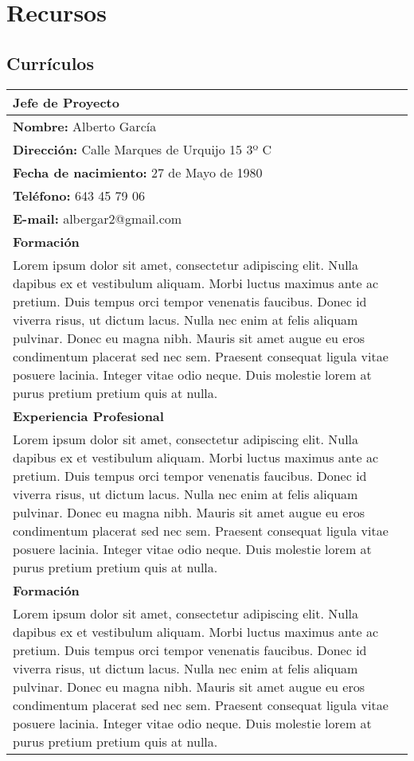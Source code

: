 \section{Recursos}
\subsection{Currículos}

\begin{table}[H]
\begin{center}
\begin{tabular}{p{}}
\textbf{Jefe de Proyecto}  \\
\hline
\textbf{Nombre:} Alberto García\\
\textbf{Dirección:} Calle Marques de Urquijo 15 3º C\\
\textbf{Fecha de nacimiento:} 27 de Mayo de 1980 \\
\textbf{Teléfono:} 643 45 79 06\\
\textbf{E-mail:} albergar2@gmail.com\\
\hline \hline
\textbf{Formación}  \\
\hline
Lorem ipsum dolor sit amet, consectetur adipiscing elit. Nulla dapibus ex et vestibulum aliquam. Morbi luctus maximus ante ac pretium. Duis tempus orci tempor venenatis faucibus. Donec id viverra risus, ut dictum lacus. Nulla nec enim at felis aliquam pulvinar. Donec eu magna nibh. Mauris sit amet augue eu eros condimentum placerat sed nec sem. Praesent consequat ligula vitae posuere lacinia. Integer vitae odio neque. Duis molestie lorem at purus pretium pretium quis at nulla. \\
\hline \hline
\textbf{Experiencia Profesional}  \\
\hline
Lorem ipsum dolor sit amet, consectetur adipiscing elit. Nulla dapibus ex et vestibulum aliquam. Morbi luctus maximus ante ac pretium. Duis tempus orci tempor venenatis faucibus. Donec id viverra risus, ut dictum lacus. Nulla nec enim at felis aliquam pulvinar. Donec eu magna nibh. Mauris sit amet augue eu eros condimentum placerat sed nec sem. Praesent consequat ligula vitae posuere lacinia. Integer vitae odio neque. Duis molestie lorem at purus pretium pretium quis at nulla. \\
\hline \hline
\textbf{Formación}  \\
\hline
Lorem ipsum dolor sit amet, consectetur adipiscing elit. Nulla dapibus ex et vestibulum aliquam. Morbi luctus maximus ante ac pretium. Duis tempus orci tempor venenatis faucibus. Donec id viverra risus, ut dictum lacus. Nulla nec enim at felis aliquam pulvinar. Donec eu magna nibh. Mauris sit amet augue eu eros condimentum placerat sed nec sem. Praesent consequat ligula vitae posuere lacinia. Integer vitae odio neque. Duis molestie lorem at purus pretium pretium quis at nulla. \\

\end{tabular}
\end{center}
\end{table}
